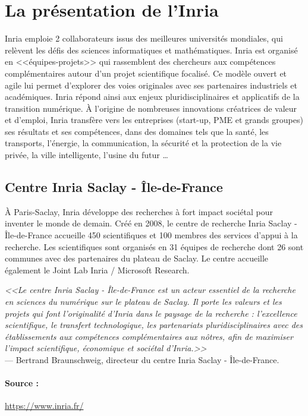 \documentclass[a4paper, titlepage, 11pt]{article}
\theoremstyle{definition}
\theoremstyle{remark}
\begin{document}
\section{La présentation de l'Inria}\label{sec:presInria}

Inria emploie 2 collaborateurs issus des meilleures universités mondiales, qui relèvent les défis des sciences informatiques et mathématiques. Inria est organisé en <<équipes-projets>> qui rassemblent des chercheurs aux compétences complémentaires autour d’un projet scientifique focalisé. Ce modèle ouvert et agile lui permet d’explorer des voies originales avec ses partenaires industriels et académiques. Inria répond ainsi aux enjeux pluridisciplinaires et applicatifs de la transition numérique. À l'origine de nombreuses innovations créatrices de valeur et d'emploi, Inria transfère vers les entreprises (start-up, PME et grands groupes) ses résultats et ses compétences, dans des domaines tels que la santé, les transports, l'énergie, la communication, la sécurité et la protection de la vie privée, la ville intelligente, l’usine du futur …

\subsection*{Centre Inria Saclay - Île-de-France}

À Paris-Saclay, Inria développe des recherches à fort impact sociétal pour inventer le monde de demain. Créé en 2008, le centre de recherche Inria Saclay - Île-de-France accueille 450 scientifiques et 100 membres des services d’appui à la recherche. Les scientifiques sont organisés en 31 équipes de recherche dont 26 sont communes avec des partenaires du plateau de Saclay. Le centre accueille également le Joint Lab Inria / Microsoft Research.

\textit{<<Le centre Inria Saclay - Île-de-France est un acteur essentiel de la recherche en sciences du numérique sur le plateau de Saclay. Il porte les valeurs et les projets qui font l’originalité d’Inria dans le paysage de la recherche : l’excellence scientifique, le transfert technologique, les partenariats pluridisciplinaires avec des établissements aux compétences complémentaires aux nôtres, afin de maximiser l’impact scientifique, économique et sociétal d’Inria.>>} \\
--- Bertrand Braunschweig, directeur du centre Inria Saclay - Île-de-France.  

\paragraph*{Source :} \url{https://www.inria.fr/}
\end{document}
